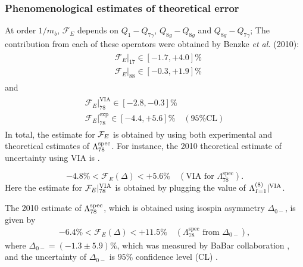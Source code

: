 \subsubsection{Phenomenological estimates of theoretical error}
\vspace{-0.2cm}
At order $1/m_{b}$, $\mathcal{F}_E$ depends on $Q_{1}-Q_{7\gamma}$, $Q_{8g}-Q_{8g}$ and $Q_{8g}-Q_{7\gamma}$; The contribution from each of these operators were obtained by Benzke \textit{et al.} (2010)\cite{Benzke:2010js}: 
\begin{eqnarray}\label{eqn:chapter3_error_est}
\begin{aligned}
&\left.\mathcal{F}_{E}\right|_{17} \in[-1.7,+4.0] \%\\
&\left.\mathcal{F}_{E}\right|_{88} \in[-0.3,+1.9] \%
\end{aligned}
\end{eqnarray}
and
\begin{eqnarray}
\begin{array}{l}
{\left.\mathcal{F}_{E}\right|_{78} ^{\mathrm{VIA}} \in[-2.8,-0.3] \%} \\
{\left.\mathcal{F}_{E}\right|_{78} ^{\mathrm{exp}} \in[-4.4,+5.6] \% \quad(95 \% \mathrm{CL})}
\end{array}
\end{eqnarray}
In total, the estimate for ${\cal F}_E$ is obtained by using both experimental and theoretical estimates of $\Lambda_{78}^{\rm{spec}}$. For instance, the 2010 theoretical estimate of uncertainty using VIA is \cite{Benzke:2010js}.

\begin{equation}\label{Fcurrentexp}
   -4.8 \%<\mathcal{F}_{E}(\Delta)<+5.6 \% \quad\left(\mathrm{VIA} \text { for } \Lambda_{78}^{\mathrm{spec}}\right).
\end{equation}
Here the estimate for $\mathcal{F}_E|^{\rm{VIA}}_{78}$ is obtained by plugging the value of $\Lambda_{I=1}^{(8)}|^{\rm{VIA}}$.\par
The 2010 estimate of $\Lambda_{78}^{\rm{spec}}$, which is obtained using isospin asymmetry $\Delta_{0-}$, is given by
\begin{eqnarray}\label{eqn:F78_using_exp}
-6.4 \%<\mathcal{F}_{E}(\Delta)<+11.5 \% \quad\left(\Lambda_{78}^{\mathrm{spec}} \text { from } \Delta_{0-}\right),
\end{eqnarray}
where $\Delta_{0-}=(-1.3 \pm 5.9) \%$, which was measured by BaBar collaboration \cite{Aubert:2005cua, Aubert:2007my}, and the uncertainty of $\Delta_{0-}$ is $95\%$ confidence level (CL) \cite{Benzke:2010js}. 

